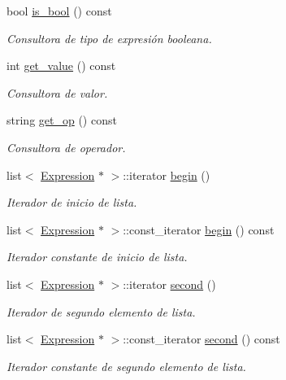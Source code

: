 \begin{DoxyCompactItemize}
bool \hyperlink{class_expression_ad42c70dcee3b195c77749ca6435c244d}{is\+\_\+bool} () const 
\begin{DoxyCompactList}\small\item\em Consultora de tipo de expresión booleana. \end{DoxyCompactList}\item 
int \hyperlink{class_expression_add3f908cb67ed993a5e886447fd70df0}{get\+\_\+value} () const 
\begin{DoxyCompactList}\small\item\em Consultora de valor. \end{DoxyCompactList}\item 
string \hyperlink{class_expression_a9216cba5bbd3ffa8c3a625a66b91b36f}{get\+\_\+op} () const 
\begin{DoxyCompactList}\small\item\em Consultora de operador. \end{DoxyCompactList}\item 
list$<$ \hyperlink{class_expression}{Expression} $\ast$ $>$\+::iterator \hyperlink{class_expression_a0ed7767d72f93c9121bb73afead5782a}{begin} ()
\begin{DoxyCompactList}\small\item\em Iterador de inicio de lista. \end{DoxyCompactList}\item 
list$<$ \hyperlink{class_expression}{Expression} $\ast$ $>$\+::const\+\_\+iterator \hyperlink{class_expression_a56b9a73d1c5f9b4c1a8a03d639e93ccb}{begin} () const 
\begin{DoxyCompactList}\small\item\em Iterador constante de inicio de lista. \end{DoxyCompactList}\item 
list$<$ \hyperlink{class_expression}{Expression} $\ast$ $>$\+::iterator \hyperlink{class_expression_ae53f7febf676d564d6393bf2762fc08e}{second} ()
\begin{DoxyCompactList}\small\item\em Iterador de segundo elemento de lista. \end{DoxyCompactList}\item 
list$<$ \hyperlink{class_expression}{Expression} $\ast$ $>$\+::const\+\_\+iterator \hyperlink{class_expression_a9991190559b6d1cc04e3b6fc2ade7b18}{second} () const 
\begin{DoxyCompactList}\small\item\em Iterador constante de segundo elemento de lista. \end{DoxyCompactList}\item 

\end{DoxyCompactItemize}
